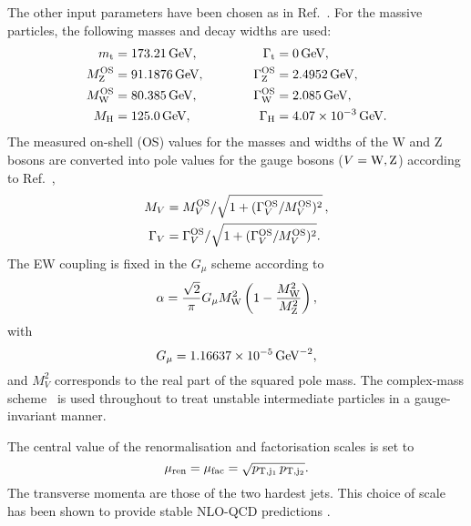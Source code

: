 \documentclass[11pt,epsf]{article}
\begin{document}
 The other input parameters have been chosen as in Ref.~\cite{Ballestrero:2018anz}.
    For the massive particles, the following masses and decay widths are used:
    \begin{alignat}{2}
                      m_\text{t}   &=  173.21\,\text{GeV},       & \quad \quad \quad \Gamma_\text{t} &= 0 \,\text{GeV},  \nonumber \\
                    M_\text{Z}^\text{OS} &=  91.1876\,\text{GeV},      & \quad \quad \quad \Gamma_\text{Z}^\text{OS} &= 2.4952\,\text{GeV},  \nonumber \\
                    M_\text{W}^\text{OS} &=  80.385\,\text{GeV},       & \Gamma_\text{W}^\text{OS} &= 2.085\,\text{GeV},  \nonumber \\
                    M_{\rm H} &=  125.0\,\text{GeV},       &  \Gamma_\text{H}   &=  4.07 \times 10^{-3}\,\text{GeV}.
    \end{alignat}
    The measured on-shell (OS) values for the masses and widths of the W and Z bosons are converted into pole values for the gauge bosons ($V=\text{W},\text{Z}$) according to Ref.~\cite{Bardin:1988xt},
    \begin{equation}
    \begin{split}
            M_V &= M_{V}^\text{OS}/\sqrt{1+(\Gamma_{V}^\text{OS}/M_{V}^\text{OS})^2}\,, \\
       \Gamma_V &= \Gamma_{V}^\text{OS}/\sqrt{1+(\Gamma_{V}^\text{OS}/M_{V}^\text{OS})^2}.
    \end{split}
    \end{equation}
    The EW coupling is fixed in the $G_\mu$ scheme \cite{Denner:2000bj} according to 
    \begin{equation}
    \alpha =  \frac{\sqrt{2}}{\pi} G_{\mu} M_{\rm W}^2 \left(1-\frac{M_{\rm W}^2}{M_{\rm Z}^2} \right),
    \end{equation}
    with
    \begin{equation}
        G_{\mu}    = 1.16637\times 10^{-5}\,\text{GeV}^{-2},
    \end{equation}
    and $M_V^2$ corresponds to the real part of the squared pole mass.
    The complex-mass scheme~\cite{Denner:1999gp,Denner:2005fg,Denner:2006ic} is used throughout to treat unstable intermediate particles in a gauge-invariant manner.

    The central value of the renormalisation and factorisation scales is set to 
    \begin{equation}
    \label{eq:defscale}
     \mu_{\rm ren} = \mu_{\rm fac} = \sqrt{p_{\rm T, j_1}\, p_{\rm T, j_2}} .
    \end{equation}
    The transverse momenta are those of the two hardest jets.
    This choice of scale has been shown to provide stable NLO-QCD predictions \cite{Denner:2012dz}.
\end{document}
